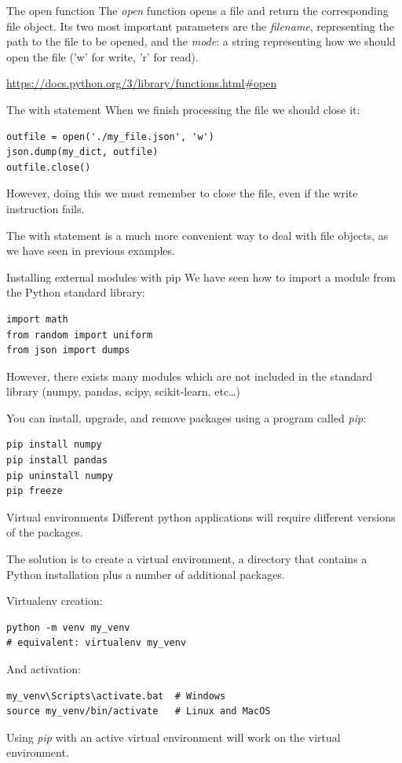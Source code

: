 \documentclass[aspectratio=169,handout]{beamer}
\begin{document}
\begin{frame}[fragile]{The open function}
    The \emph{open} function opens a file and return the corresponding file object.
    Its two most important parameters are the \emph{filename}, representing the path to the file to be opened, and the
    \emph{mode}: a string representing how we should open the file ('w' for write, 'r' for read).

    \url{https://docs.python.org/3/library/functions.html#open}
\end{frame}

\begin{frame}[fragile]{The with statement}
    When we finish processing the file we should close it:
    \begin{verbatim}
outfile = open('./my_file.json', 'w')
json.dump(my_dict, outfile)
outfile.close()
    \end{verbatim}
    However, doing this we must remember to close the file, even if the write instruction fails.

    The with statement is a much more convenient way to deal with file objects, as we have seen in previous examples.
\end{frame}



\begin{frame}[fragile]{Installing external modules with pip}
    We have seen how to import a module from the Python standard library:
    \begin{verbatim}
import math
from random import uniform
from json import dumps
    \end{verbatim}

    However, there exists many modules which are not included in the standard library (numpy, pandas, scipy,
    scikit-learn, etc\ldots)

    You can install, upgrade, and remove packages using a program called \emph{pip}:
    \begin{verbatim}
pip install numpy
pip install pandas
pip uninstall numpy
pip freeze
    \end{verbatim}
\end{frame}

\begin{frame}[fragile]{Virtual environments}
    Different python applications will require different versions of the packages.

    The solution is to create a virtual environment, a directory that contains a
    Python installation plus a number of additional packages.

    Virtualenv creation:
    \begin{verbatim}
python -m venv my_venv
# equivalent: virtualenv my_venv
    \end{verbatim}

    And activation:
    \begin{verbatim}
my_venv\Scripts\activate.bat  # Windows
source my_venv/bin/activate   # Linux and MacOS
    \end{verbatim}

    Using \emph{pip} with an active virtual environment will work on the virtual environment.
\end{frame}
\end{document}
